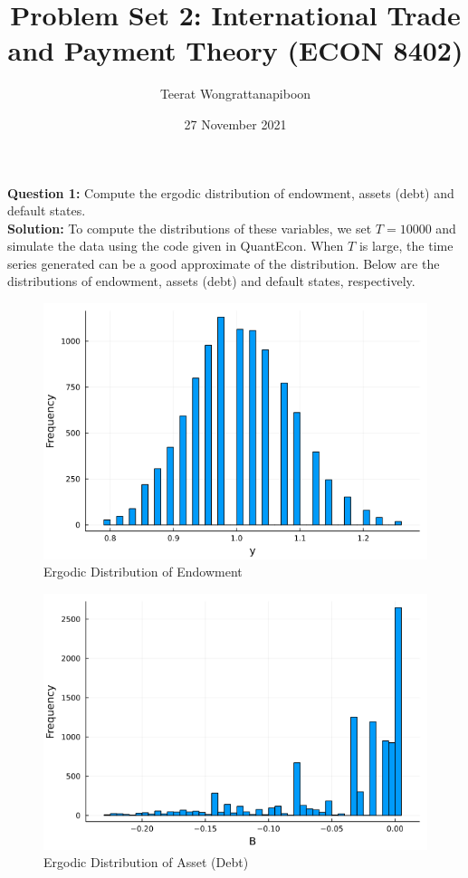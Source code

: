 \documentclass{article}
\title{Problem Set 2: International Trade and Payment Theory (ECON 8402)}
\author{Teerat Wongrattanapiboon}
\date{27 November 2021}
\begin{document}
	\maketitle
	
	\noindent\textbf{Question 1:} Compute the ergodic distribution of endowment, assets (debt) and default states. \\
	
	\noindent\textbf{Solution:} To compute the distributions of these variables, we set $T = 10000$ and simulate the data using the code given in QuantEcon. When $T$ is large, the time series generated can be a good approximate of the distribution. Below are the distributions of endowment, assets (debt) and default states, respectively.
	
	\begin{figure}[htbp]
		\centering
		\includegraphics[scale=0.5]{endow_hist.png}
		\caption{Ergodic Distribution of Endowment}
	\end{figure}
	
	\begin{figure}[htbp]
		\centering
		\includegraphics[scale=0.5]{B_hist.png}
		\caption{Ergodic Distribution of Asset (Debt)}
		\label{Fig2}
	\end{figure}
	
\end{document}
